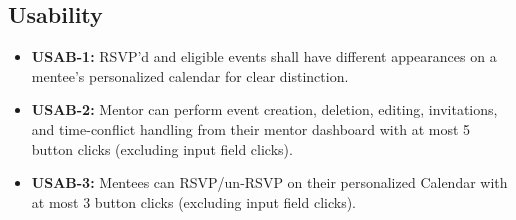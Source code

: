 \subsection{Usability}

\begin{itemize}
    \item \textbf{USAB-1:} RSVP'd and eligible events shall have different
    appearances on a mentee's personalized calendar for clear distinction.

    \item \textbf{USAB-2:} Mentor can perform event creation, deletion, editing,
    invitations, and time-conflict handling from their mentor dashboard with at
    most 5 button clicks (excluding input field clicks).
    
    \item \textbf{USAB-3:} Mentees can RSVP/un-RSVP on their personalized
    Calendar with at most 3 button clicks (excluding input field clicks).
\end{itemize}
